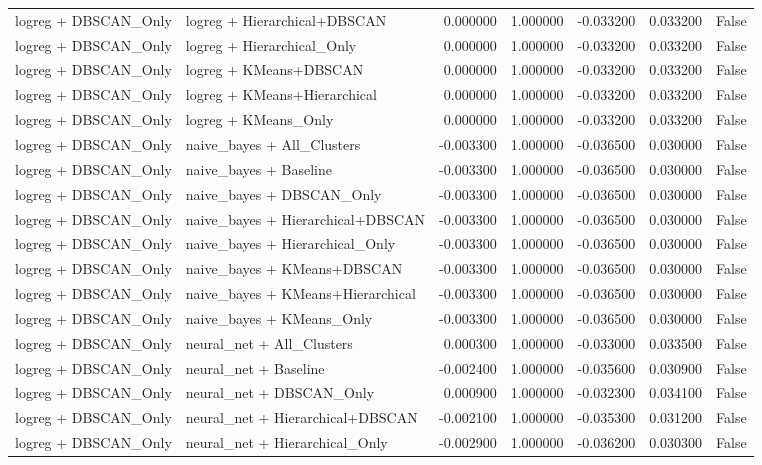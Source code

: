 \begin{tabular}{llrrrrr}
logreg + DBSCAN_Only & logreg + Hierarchical+DBSCAN & 0.000000 & 1.000000 & -0.033200 & 0.033200 & False \\
logreg + DBSCAN_Only & logreg + Hierarchical_Only & 0.000000 & 1.000000 & -0.033200 & 0.033200 & False \\
logreg + DBSCAN_Only & logreg + KMeans+DBSCAN & 0.000000 & 1.000000 & -0.033200 & 0.033200 & False \\
logreg + DBSCAN_Only & logreg + KMeans+Hierarchical & 0.000000 & 1.000000 & -0.033200 & 0.033200 & False \\
logreg + DBSCAN_Only & logreg + KMeans_Only & 0.000000 & 1.000000 & -0.033200 & 0.033200 & False \\
logreg + DBSCAN_Only & naive_bayes + All_Clusters & -0.003300 & 1.000000 & -0.036500 & 0.030000 & False \\
logreg + DBSCAN_Only & naive_bayes + Baseline & -0.003300 & 1.000000 & -0.036500 & 0.030000 & False \\
logreg + DBSCAN_Only & naive_bayes + DBSCAN_Only & -0.003300 & 1.000000 & -0.036500 & 0.030000 & False \\
logreg + DBSCAN_Only & naive_bayes + Hierarchical+DBSCAN & -0.003300 & 1.000000 & -0.036500 & 0.030000 & False \\
logreg + DBSCAN_Only & naive_bayes + Hierarchical_Only & -0.003300 & 1.000000 & -0.036500 & 0.030000 & False \\
logreg + DBSCAN_Only & naive_bayes + KMeans+DBSCAN & -0.003300 & 1.000000 & -0.036500 & 0.030000 & False \\
logreg + DBSCAN_Only & naive_bayes + KMeans+Hierarchical & -0.003300 & 1.000000 & -0.036500 & 0.030000 & False \\
logreg + DBSCAN_Only & naive_bayes + KMeans_Only & -0.003300 & 1.000000 & -0.036500 & 0.030000 & False \\
logreg + DBSCAN_Only & neural_net + All_Clusters & 0.000300 & 1.000000 & -0.033000 & 0.033500 & False \\
logreg + DBSCAN_Only & neural_net + Baseline & -0.002400 & 1.000000 & -0.035600 & 0.030900 & False \\
logreg + DBSCAN_Only & neural_net + DBSCAN_Only & 0.000900 & 1.000000 & -0.032300 & 0.034100 & False \\
logreg + DBSCAN_Only & neural_net + Hierarchical+DBSCAN & -0.002100 & 1.000000 & -0.035300 & 0.031200 & False \\
logreg + DBSCAN_Only & neural_net + Hierarchical_Only & -0.002900 & 1.000000 & -0.036200 & 0.030300 & False \\

\end{tabular}
